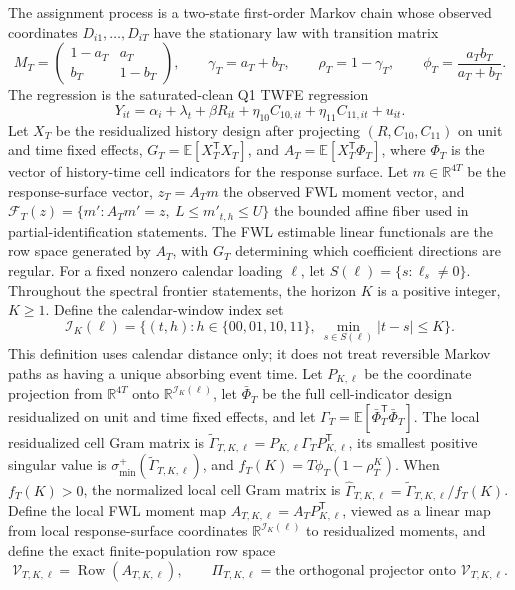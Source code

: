 \documentclass[11pt]{article}
\newcommand{\E}{\mathbb{E}}
\newcommand{\transpose}{\mathsf{T}}
\theoremstyle{definition}
\theoremstyle{plain}
\theoremstyle{remark}
\begin{document}
The assignment process is a two-state first-order Markov chain whose observed coordinates \(D_{i1},\ldots,D_{iT}\) have the stationary law with transition matrix
\[
M_T=\begin{pmatrix}1-a_T&a_T\\ b_T&1-b_T\end{pmatrix},
\qquad
\gamma_T=a_T+b_T,\qquad
\rho_T=1-\gamma_T,\qquad
\phi_T=\frac{a_Tb_T}{a_T+b_T}.
\]
The regression is the saturated-clean Q1 TWFE regression
\[
Y_{it}=\alpha_i+\lambda_t+\beta R_{it}+\eta_{10}C_{10,it}+\eta_{11}C_{11,it}+u_{it}.
\]
Let \(X_T\) be the residualized history design after projecting \((R,C_{10},C_{11})\) on unit and time fixed effects, \(G_T=\E[X_T^\transpose X_T]\), and \(A_T=\E[X_T^\transpose \Phi_T]\), where \(\Phi_T\) is the vector of history-time cell indicators for the response surface.
Let \(m\in\mathbb R^{4T}\) be the response-surface vector, \(z_T=A_Tm\) the observed FWL moment vector, and \(\mathcal F_T(z)=\{m':A_Tm'=z,\ L\le m'_{t,h}\le U\}\) the bounded affine fiber used in partial-identification statements.
The FWL estimable linear functionals are the row space generated by \(A_T\), with \(G_T\) determining which coefficient directions are regular.
For a fixed nonzero calendar loading \(\ell\), let \(S(\ell)=\{s:\ell_s\ne0\}\).
Throughout the spectral frontier statements, the horizon \(K\) is a positive integer, \(K\ge1\).
Define the calendar-window index set
\[
\mathcal I_K(\ell)=\{(t,h): h\in\{00,01,10,11\},\ \min_{s\in S(\ell)} |t-s|\le K\}.
\]
This definition uses calendar distance only; it does not treat reversible Markov paths as having a unique absorbing event time.
Let \(P_{K,\ell}\) be the coordinate projection from \(\mathbb R^{4T}\) onto \(\mathbb R^{\mathcal I_K(\ell)}\), let \(\bar\Phi_T\) be the full cell-indicator design residualized on unit and time fixed effects, and let \(\Gamma_T=\E[\bar\Phi_T^\transpose \bar\Phi_T]\).
The local residualized cell Gram matrix is \(\widetilde \Gamma_{T,K,\ell}=P_{K,\ell}\Gamma_TP_{K,\ell}^\transpose\), its smallest positive singular value is \(\sigma_{\min}^+(\widetilde \Gamma_{T,K,\ell})\), and \(f_T(K)=T\phi_T(1-\rho_T^K)\).
When \(f_T(K)>0\), the normalized local cell Gram matrix is \(\widehat \Gamma_{T,K,\ell}=\widetilde \Gamma_{T,K,\ell}/f_T(K)\).
Define the local FWL moment map \(A_{T,K,\ell}=A_TP_{K,\ell}^{\transpose}\), viewed as a linear map from local response-surface coordinates \(\mathbb R^{\mathcal I_K(\ell)}\) to residualized moments, and define the exact finite-population row space
\[
\mathcal V_{T,K,\ell}=\operatorname{Row}(A_{T,K,\ell}),\qquad
\Pi_{T,K,\ell}=\text{the orthogonal projector onto }\mathcal V_{T,K,\ell}.
\]
\end{document}
